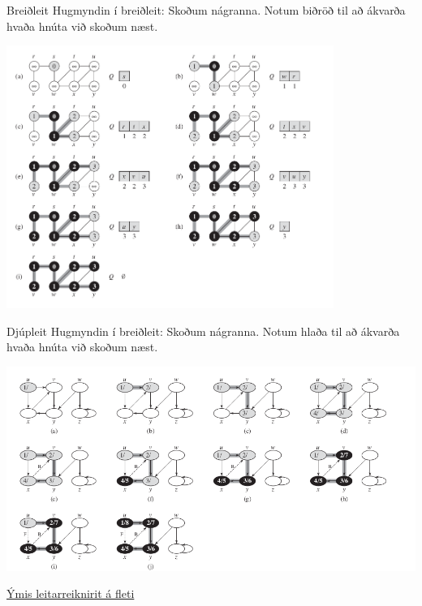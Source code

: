 \documentclass{beamer}
\begin{document}
\begin{frame}{Breiðleit}
Hugmyndin í breiðleit: Skoðum nágranna. Notum biðröð til að ákvarða hvaða hnúta við skoðum næst.
\begin{center}
\includegraphics[width=0.8\textwidth]{Pics/bfs-example}
\end{center}
\end{frame}

\begin{frame}{Djúpleit}
Hugmyndin í breiðleit: Skoðum nágranna. Notum hlaða til að ákvarða hvaða hnúta við skoðum næst.
\begin{center}
\includegraphics[width=\textwidth]{Pics/dfs-example}
\end{center}
\end{frame}

\begin{frame}
\href{http://qiao.github.io/PathFinding.js/visual/}{Ýmis leitarreiknirit á fleti}
\end{frame}
\end{document}
